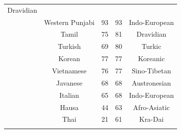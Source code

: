 {\begin{tabular}{|c|c|c|c|c|}
Dravidian \\
	\thetablecount\stepcounter{tablecount} &

Western Punjabi &
	

93 &
	

93 &
	

Indo-European \\

	\thetablecount\stepcounter{tablecount} &
Tamil &
	

75 &
	

81 &
	

Dravidian \\

	\thetablecount\stepcounter{tablecount} &
Turkish &
	

69 &
	

80 &
	

Turkic \\

	\thetablecount\stepcounter{tablecount} &
Korean &
	

77 &
	

77 &
	

Koreanic \\

	\thetablecount\stepcounter{tablecount} &
Vietnamese &
	

76 &
	

77 &
	

Sino-Tibetan \\

	\thetablecount\stepcounter{tablecount} &
Javanese &
	

68 &
	

68 &
	

Austronesian \\

	\thetablecount\stepcounter{tablecount} &
Italian &
	

65 &
	

68 &
	

Indo-European \\
	\thetablecount\stepcounter{tablecount} &

Hausa &
	

44 &
	

63 &
	

Afro-Asiatic \\

	\thetablecount\stepcounter{tablecount} &
Thai &
	

21 &
	

61 &
	

Kra-Dai \\
	\thetablecount\stepcounter{tablecount} &


\end{tabular}}
